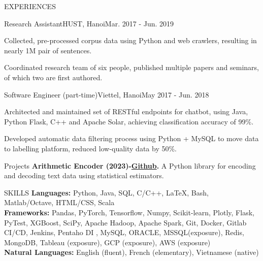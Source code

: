 \documentclass{resume} %
\begin{document}
\begin{rSection}{EXPERIENCES}
\begin{rWork}{Research Assistant}{HUST, Hanoi}{Mar. 2017 - Jun. 2019}
    \item Collected, pre-processed corpus data using Python and web crawlers, resulting in nearly 1M pair of sentences.
    \item Coordinated research team of six people, published multiple papers and seminars, of which two are first authored.
  \end{rWork}
  \begin{rWork}{Software Engineer (part-time)}{Viettel, Hanoi}{May 2017 - Jun. 2018}
    \item Architected and maintained set of RESTful endpoints for chatbot, using Java, Python Flask, C++ and Apache Solar, achieving classification accuracy of 99\%.
    \item Developed automatic data filtering process using Python + MySQL to move data to labelling platform, reduced low-quality data by 50\%.
  \end{rWork}
  \end{rSection}
\begin{rSection}{Projects}
\textbf{Arithmetic Encoder (2023)-\href{https://github.com/HongHaiPV/ArithmeticEncoder}{Github}.} A Python library for encoding and decoding text data using statistical estimators.
\end{rSection}
\begin{rSection}{SKILLS}
\textbf{Languages:} Python, Java, SQL, C/C++, \LaTeX, Bash, Matlab/Octave, HTML/CSS, Scala\\
\textbf{Frameworks:} Pandas, PyTorch, Tensorflow, Numpy, Scikit-learn, Plotly, Flask, PyTest, XGBoost, SciPy, Apache Hadoop, Apache Spark, Git, Docker, Gitlab CI/CD, Jenkins, Pentaho DI , MySQL, ORACLE, MSSQL(exposure), Redis, MongoDB, Tableau (exposure), GCP (exposure), AWS (exposure)\\
\textbf{Natural Languages:} English (fluent), French (elementary), Vietnamese (native)\\
\end{rSection}
\end{document}
